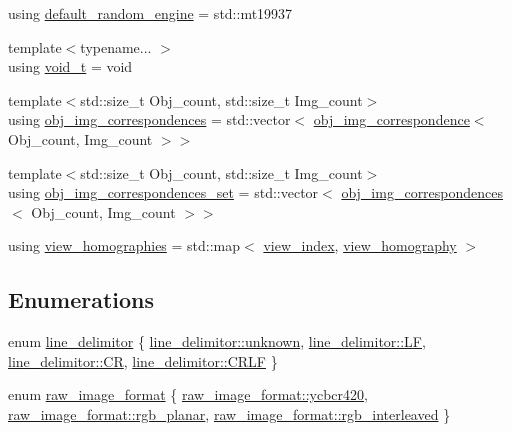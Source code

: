 \begin{DoxyCompactItemize}
\item 
using \hyperlink{namespacetlz_ac874ea3afd9982e4ba55013615f44871}{default\+\_\+random\+\_\+engine} = std\+::mt19937
\item 
{\footnotesize template$<$typename... $>$ }\\using \hyperlink{namespacetlz_a7d87dc9fbb481b3af71497097f545493}{void\+\_\+t} = void
\item 
{\footnotesize template$<$std\+::size\+\_\+t Obj\+\_\+count, std\+::size\+\_\+t Img\+\_\+count$>$ }\\using \hyperlink{namespacetlz_a59fe514deacf47a3f4a14450a3752725}{obj\+\_\+img\+\_\+correspondences} = std\+::vector$<$ \hyperlink{structtlz_1_1obj__img__correspondence}{obj\+\_\+img\+\_\+correspondence}$<$ Obj\+\_\+count, Img\+\_\+count $>$$>$
\item 
{\footnotesize template$<$std\+::size\+\_\+t Obj\+\_\+count, std\+::size\+\_\+t Img\+\_\+count$>$ }\\using \hyperlink{namespacetlz_a3dec48786e0f39d39c096eb127945c27}{obj\+\_\+img\+\_\+correspondences\+\_\+set} = std\+::vector$<$ \hyperlink{namespacetlz_a59fe514deacf47a3f4a14450a3752725}{obj\+\_\+img\+\_\+correspondences}$<$ Obj\+\_\+count, Img\+\_\+count $>$$>$
\item 
using \hyperlink{namespacetlz_abd9713860da221719662169bd1821a9d}{view\+\_\+homographies} = std\+::map$<$ \hyperlink{structtlz_1_1view__index}{view\+\_\+index}, \hyperlink{structtlz_1_1view__homography}{view\+\_\+homography} $>$
\end{DoxyCompactItemize}
\subsection*{Enumerations}
\begin{DoxyCompactItemize}
\item 
enum \hyperlink{namespacetlz_a9643974618d6e98138d9b009f5f6123d}{line\+\_\+delimitor} \{ \hyperlink{namespacetlz_a9643974618d6e98138d9b009f5f6123daad921d60486366258809553a3db49a4a}{line\+\_\+delimitor\+::unknown}, 
\hyperlink{namespacetlz_a9643974618d6e98138d9b009f5f6123da618441d41cce47dbcfd9bed6e5ff64e6}{line\+\_\+delimitor\+::\+LF}, 
\hyperlink{namespacetlz_a9643974618d6e98138d9b009f5f6123da1d7b33fc26ca22c2011aaa97fecc43d8}{line\+\_\+delimitor\+::\+CR}, 
\hyperlink{namespacetlz_a9643974618d6e98138d9b009f5f6123da50d5a4893c775dd805a095efef17ef3d}{line\+\_\+delimitor\+::\+C\+R\+LF}
 \}
\item 
enum \hyperlink{namespacetlz_a2f57d45973aaddeff07516fa8cc48e46}{raw\+\_\+image\+\_\+format} \{ \hyperlink{namespacetlz_a2f57d45973aaddeff07516fa8cc48e46a86e9a4ccaef824ab228794dfa922dde4}{raw\+\_\+image\+\_\+format\+::ycbcr420}, 
\hyperlink{namespacetlz_a2f57d45973aaddeff07516fa8cc48e46a9ea80d9dd289380a982d722b364310ee}{raw\+\_\+image\+\_\+format\+::rgb\+\_\+planar}, 
\hyperlink{namespacetlz_a2f57d45973aaddeff07516fa8cc48e46a8fd0d55627eb3647ea8451c0b65e1f05}{raw\+\_\+image\+\_\+format\+::rgb\+\_\+interleaved}
 \}
\end{DoxyCompactItemize}
